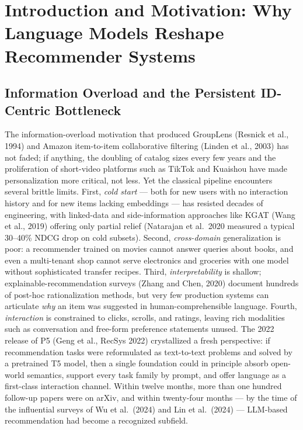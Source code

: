 \section{Introduction and Motivation: Why Language Models Reshape Recommender Systems}\label{introduction-and-motivation-why-language-models-reshape-recommender-systems}

\subsection{Information Overload and the Persistent ID-Centric Bottleneck}\label{information-overload-and-the-persistent-id-centric-bottleneck}

The information-overload motivation that produced GroupLens (Resnick et al., 1994) and Amazon item-to-item collaborative filtering (Linden et al., 2003) has not faded; if anything, the doubling of catalog sizes every few years and the proliferation of short-video platforms such as TikTok and Kuaishou have made personalization more critical, not less. Yet the classical pipeline encounters several brittle limits. First, \emph{cold start} --- both for new users with no interaction history and for new items lacking embeddings --- has resisted decades of engineering, with linked-data and side-information approaches like KGAT (Wang et al., 2019) offering only partial relief (Natarajan et al.~2020 measured a typical 30--40\% NDCG drop on cold subsets). Second, \emph{cross-domain} generalization is poor: a recommender trained on movies cannot answer queries about books, and even a multi-tenant shop cannot serve electronics and groceries with one model without sophisticated transfer recipes. Third, \emph{interpretability} is shallow; explainable-recommendation surveys (Zhang and Chen, 2020) document hundreds of post-hoc rationalization methods, but very few production systems can articulate \emph{why} an item was suggested in human-comprehensible language. Fourth, \emph{interaction} is constrained to clicks, scrolls, and ratings, leaving rich modalities such as conversation and free-form preference statements unused. The 2022 release of P5 (Geng et al., RecSys 2022) crystallized a fresh perspective: if recommendation tasks were reformulated as text-to-text problems and solved by a pretrained T5 model, then a single foundation could in principle absorb open-world semantics, support every task family by prompt, and offer language as a first-class interaction channel. Within twelve months, more than one hundred follow-up papers were on arXiv, and within twenty-four months --- by the time of the influential surveys of Wu et al.~(2024) and Lin et al.~(2024) --- LLM-based recommendation had become a recognized subfield.

